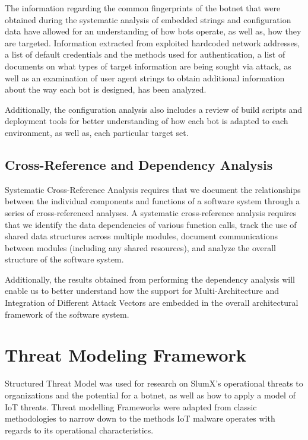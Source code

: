 \documentclass[12pt,letterpaper]{report}
\begin{document}
The information regarding the common fingerprints of the botnet that were obtained during the systematic analysis of embedded strings and configuration data have allowed for an understanding of how bots operate, as well as, how they are targeted. Information extracted from exploited hardcoded network addresses, a list of default credentials and the methods used for authentication, a list of documents on what types of target information are being sought via attack, as well as an examination of user agent strings to obtain additional information about the way each bot is designed, has been analyzed.

Additionally, the configuration analysis also includes a review of build scripts and deployment tools for better understanding of how each bot is adapted to each environment, as well as, each particular target set.

\subsection{Cross-Reference and Dependency Analysis}

Systematic Cross-Reference Analysis requires that we document the relationships between the individual components and functions of a software system through a series of cross-referenced analyses. A systematic cross-reference analysis requires that we identify the data dependencies of various function calls, track the use of shared data structures across multiple modules, document communications between modules (including any shared resources), and analyze the overall structure of the software system.

Additionally, the results obtained from performing the dependency analysis will enable us to better understand how the support for Multi-Architecture and Integration of Different Attack Vectors are embedded in the overall architectural framework of the software system.

\section{Threat Modeling Framework}

Structured Threat Model was used for research on SlumX's operational threats to organizations and the potential for a botnet, as well as how to apply a model of IoT threats. Threat modelling Frameworks were adapted from classic methodologies to narrow down to the methods IoT malware operates with regards to its operational characteristics.  
\end{document}
